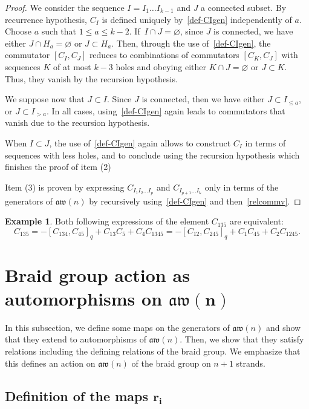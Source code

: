 \documentclass[10pt,a4paper]{amsart}
\numberwithin{equation}{section}
\theoremstyle{definition}
\newtheorem{exam}[theo]{Example}
\newcommand{\aw}{\mathfrak{aw}(n)}
\begin{document}
\begin{proof}
We consider the
sequence $I=I_1\dots I_{k-1}$ and $J$ a connected subset. By recurrence hypothesis, $C_I$ is defined uniquely by~\eqref{def-CIgen} independently of $a$.
Choose $a$ such that $1\leq a \leq k-2$.
If~$I\cap J=\varnothing$, since $J$ is connected, we have either $J\cap H_a=\varnothing$ or $J\subset H_a$.
Then, through the use of~\eqref{def-CIgen}, the commutator $[C_I,C_J]$ reduces to combinations of commutators $[C_K,C_J]$ with
sequences $K$ of at most $k-3$ holes and obeying either $K\cap J=\varnothing$ or $J\subset K$. Thus, they vanish by the recursion hypothesis.

We suppose now that $J\subset I$. Since $J$ is connected, then we have either $J\subset I_{\leq a}$, or $J\subset I_{>a}$.
In all cases, using~\eqref{def-CIgen} again leads to commutators that vanish due to the recursion hypothesis.

When $I\subset J$, the use of~\eqref{def-CIgen} again allows to construct $C_I$ in terms of sequences with less holes, and to conclude using the recursion hypothesis which finishes the proof of item (2)

Item (3) is proven by expressing $C_{I_1I_2\dots I_p}$ and $C_{I_{p+1}\dots I_k}$ only in terms of the generators of $\aw$ by recursively using~\eqref{def-CIgen} and then~\eqref{relcommv}.
\end{proof}

\begin{exam}
Both following expressions of the element $C_{135}$ are equivalent:
\begin{equation*}
 C_{135} =-[C_{134},C_{45}]_q+C_{13}C_{5}+C_{4}C_{1345}=-[C_{12},C_{245}]_q+C_1C_{45}+C_2C_{1245} .
\end{equation*}
\end{exam}

\section[Braid group action as automorphisms on aw(n)]{Braid group action as automorphisms on $\boldsymbol{\aw}$}\label{sec-auto}

In this subsection, we define some maps on the generators of $\aw$ and show that they extend to automorphisms of $\aw$.
Then, we show that they satisfy relations including the defining relations of the braid group. We emphasize that this defines an action on $\aw$ of the braid group on $n+1$ strands.

\subsection[Definition of the maps r\_i]{Definition of the maps $\boldsymbol{r_i}$}
\end{document}
